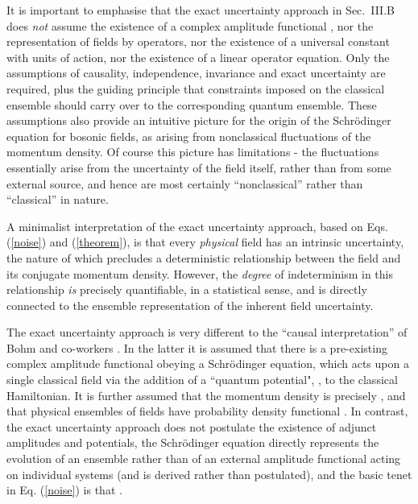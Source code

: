 \documentclass[a4paper,preprint, showpacs, aps, draft]{revtex4}
\begin{document}
{{It is important to emphasise that the exact uncertainty approach in
Sec.~III.B 
does {\it not} assume the existence of a complex amplitude functional
\myHighlight{$\Psi[f]$}\coordHE{}, nor the representation of fields by operators, nor the
existence of a universal constant \myHighlight{$\hbar$}\coordHE{} with units of action, nor the
existence of a linear operator equation.  Only the assumptions of
causality, independence, invariance and exact uncertainty are required,
plus the guiding principle that constraints imposed on the classical
ensemble should carry over to the corresponding quantum ensemble. These
assumptions also provide an intuitive picture for the origin of the
Schr\"{o}dinger equation for bosonic fields, 
as arising from nonclassical fluctuations of
the momentum density.  Of course this picture has limitations - the
fluctuations essentially arise from the uncertainty of the field itself, rather
than from some external source, and hence are 
most certainly ``nonclassical'' rather than ``classical'' 
in nature.  

A minimalist interpretation of the exact uncertainty approach, based on
Eqs. (\ref{noise}) and (\ref{theorem}),
is that every {\it physical} field has an intrinsic uncertainty, 
the nature of which precludes
a deterministic relationship between the field and its
conjugate momentum density.  However, the {\it degree} of indeterminism in
this relationship {\it is} precisely quantifiable, in a statistical sense,
and is directly connected to the ensemble representation of the
inherent field uncertainty.

The exact uncertainty approach is very different to
the ``causal interpretation'' of Bohm and co-workers \cite{holland}.
In the latter it is assumed that there is a pre-existing complex
amplitude functional \coordHE{} 
obeying a Schr\"{o}dinger equation, 
which acts upon a single classical field  via
the addition of a ``quantum potential", \coordHE{}, to the classical Hamiltonian.
It is further assumed that the momentum density is precisely 
\coordHE{}, and that physical ensembles of fields have 
probability density functional \coordHE{}.
In contrast, the exact
uncertainty approach does not postulate the existence of adjunct
amplitudes and potentials, the Schr\"{o}dinger equation 
directly represents the evolution of an ensemble rather than of an 
external amplitude functional acting on individual systems 
(and is derived rather than postulated), 
and the basic tenet in Eq. (\ref{noise}) 
is that \coordHE{}.

}}
\end{document}
